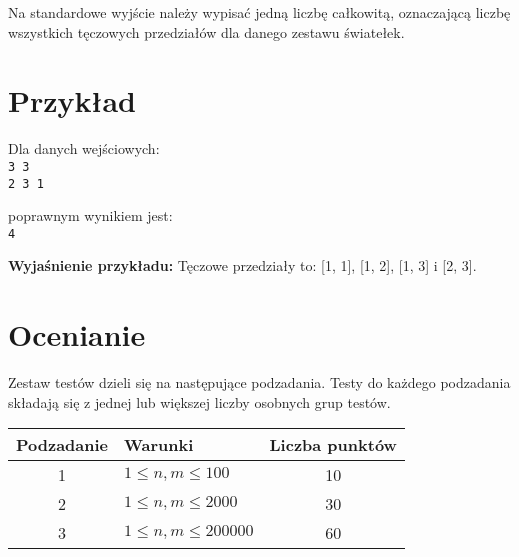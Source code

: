 \documentclass[10pt]{article}
\begin{document}
    Na standardowe wyjście należy wypisać jedną liczbę całkowitą, oznaczającą liczbę wszystkich tęczowych przedziałów dla danego zestawu światełek.


    \section*{Przykład}
    
    \noindent
    \begin{minipage}[t]{0.5\textwidth}
        Dla danych wejściowych:\vspace{1ex}\\
        \texttt{3 3\\2 3 1}
    \end{minipage}
    \begin{minipage}[t]{0.5\textwidth}
        poprawnym wynikiem jest:\vspace{1ex}\\
        \texttt{4}
    \end{minipage}
    
    \vspace{2ex}
    \noindent\textbf{Wyjaśnienie przykładu:} Tęczowe przedziały to: [1, 1], [1, 2], [1, 3] i [2, 3]. 
    

    \section*{Ocenianie}
        
    Zestaw testów dzieli się na następujące podzadania. Testy do każdego podzadania składają się z jednej lub większej liczby osobnych grup testów.
    
    \begin{center}
        \begin{tabular}{ |c|p{9cm}|c| }
            \hline
            \textbf{Podzadanie} & \textbf{Warunki} & \textbf{Liczba punktów}\\
            \hline
            1 & $1 \leq n, m \leq 100$ & 10\\
            \hline
            2 & $1 \leq n, m \leq 2000$ & 30\\
            \hline
            3 & $1 \leq n, m \leq 200000$ & 60\\
            \hline
            
        \end{tabular}
    \end{center}
\end{document}
